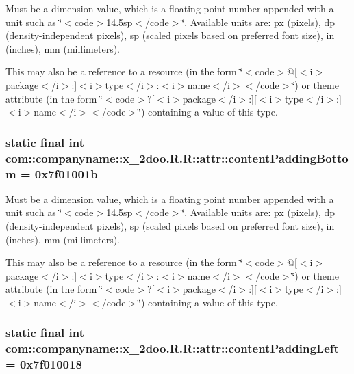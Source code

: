 Must be a dimension value, which is a floating point number appended with a unit such as \char`\"{}$<$code$>$14.5sp$<$/code$>$\char`\"{}. Available units are: px (pixels), dp (density-independent pixels), sp (scaled pixels based on preferred font size), in (inches), mm (millimeters). 

This may also be a reference to a resource (in the form \char`\"{}$<$code$>$@\mbox{[}$<$i$>$package$<$/i$>$:\mbox{]}$<$i$>$type$<$/i$>$:$<$i$>$name$<$/i$>$$<$/code$>$\char`\"{}) or theme attribute (in the form \char`\"{}$<$code$>$?\mbox{[}$<$i$>$package$<$/i$>$:\mbox{]}\mbox{[}$<$i$>$type$<$/i$>$:\mbox{]}$<$i$>$name$<$/i$>$$<$/code$>$\char`\"{}) containing a value of this type. \hypertarget{classcom_1_1companyname_1_1x__2doo_1_1_r_1_1attr_e0860be18c327cbdf719349cd1c2a8dd}{
\subsubsection[{contentPaddingBottom}]{\setlength{\rightskip}{0pt plus 5cm}static final int com::companyname::x\_\-2doo.R.R::attr::contentPaddingBottom = 0x7f01001b}}
\label{classcom_1_1companyname_1_1x__2doo_1_1_r_1_1attr_e0860be18c327cbdf719349cd1c2a8dd}


Must be a dimension value, which is a floating point number appended with a unit such as \char`\"{}$<$code$>$14.5sp$<$/code$>$\char`\"{}. Available units are: px (pixels), dp (density-independent pixels), sp (scaled pixels based on preferred font size), in (inches), mm (millimeters). 

This may also be a reference to a resource (in the form \char`\"{}$<$code$>$@\mbox{[}$<$i$>$package$<$/i$>$:\mbox{]}$<$i$>$type$<$/i$>$:$<$i$>$name$<$/i$>$$<$/code$>$\char`\"{}) or theme attribute (in the form \char`\"{}$<$code$>$?\mbox{[}$<$i$>$package$<$/i$>$:\mbox{]}\mbox{[}$<$i$>$type$<$/i$>$:\mbox{]}$<$i$>$name$<$/i$>$$<$/code$>$\char`\"{}) containing a value of this type. \hypertarget{classcom_1_1companyname_1_1x__2doo_1_1_r_1_1attr_8742b964a2a0c6863c5e54a6781f6e1f}{
\subsubsection[{contentPaddingLeft}]{\setlength{\rightskip}{0pt plus 5cm}static final int com::companyname::x\_\-2doo.R.R::attr::contentPaddingLeft = 0x7f010018}}
\label{classcom_1_1companyname_1_1x__2doo_1_1_r_1_1attr_8742b964a2a0c6863c5e54a6781f6e1f}


